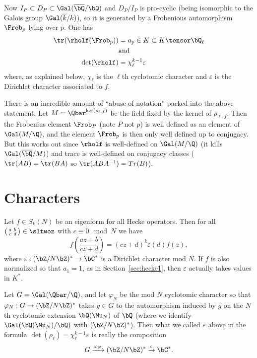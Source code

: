 \documentclass{report}
\begin{document}
Now $I_P\subset D_P \subset \Gal(\overline{\bQ}/\bQ)$ and $D_P / I_P$
is pro-cyclic (being isomorphic to the Galois group
$\Gal(\overline{k}/k)$), so it is generated by a Frobenious
automorphism $\Frob_p$ lying over $p$.  One has
\begin{align*}
\tr(\rholf(\Frob_p))& = a_p\in K \subset K\tensor \bQ_{\ell}\\
&\text{and}\\
\det(\rholf) &= \chi_{\ell}^{k-1}\varepsilon
\end{align*}
where, as explained below, $\chi_{\ell}$ is the $\ell$th cyclotomic
character and $\varepsilon$ is the Dirichlet character associated to
$f$.

There is an incredible amount of ``abuse of notation'' packed into the
above statement.  Let $M=\Qbar^{\ker(\rho_{\ell,f})}$ be the field
fixed by the kernel of $\rho_{\ell,f}$.  Then the Frobenius element
$\Frob_P$ (note $P$ not $p$) is well defined as an element of
$\Gal(M/\Q)$, and the element $\Frob_p$ is then only well defined up
to conjugacy.  But this works out since $\rholf$ is well-defined on
$\Gal(M/\Q)$ (it kills $\Gal(\overline{\bQ}/M)$) and trace is
well-defined on conjugacy classes ($\tr(AB)=\tr(BA)$ so
$\tr(ABA^{-1})=Tr(B)$).


\section{Characters}
Let $f\in S_k(N)$ be an eigenform for all Hecke operators. Then for all
$\bigl(\begin{smallmatrix} a&b\\c&d\end{smallmatrix}\bigr)
\in \sltwoz$ with $c\equiv 0 \mod{N}$ we have
\begin{equation*}
f\left(\frac{az+b}{cz+d}\right) = (cz+d)^k \varepsilon(d) f(z),
\end{equation*}
where $\varepsilon:(\bZ/N\bZ)^*\rightarrow \bC^*$
is a Dirichlet character mod $N$. If $f$ is also normalized so that
$a_1=1$, as in Section~\ref{sec:hecke1},
then $\varepsilon$ actually takes values in $K^*$.

Let $G=\Gal(\Qbar/\Q)$,
and let $\varphi_N$ be the mod $N$ cyclotomic character so that
$\varphi_N: G \rightarrow (\bZ/N\bZ)^*$ takes $g\in G$ to
the automorphism induced by $g$ on the $N$th cyclotomic
extension $\bQ(\Mu_N)$ of $\bQ$ (where we identify
$\Gal(\bQ(\Mu_N)/\bQ)$ with $(\bZ/N\bZ)^*$).
Then what we called $\varepsilon$ above in the formula
$\det(\rho_{\ell})=\chi_{\ell}^{k-1}\varepsilon$
is really the composition
\begin{equation*}
G\xrightarrow{\varphi_N}(\bZ/N\bZ)^*\xrightarrow{\varepsilon} \bC^*.
\end{equation*}
\end{document}
